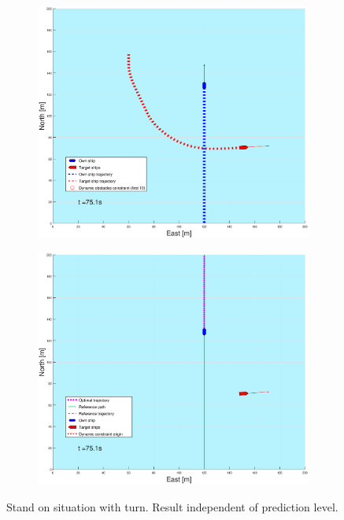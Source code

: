 \begin{figure}[ht!]
\begin{subfigure}[b]{0.499\textwidth}
    \end{subfigure}
    \hfill
    \\
    \begin{subfigure}[b]{0.49\textwidth}
        \centering
        \includegraphics[width=\textwidth]{Images/Figures/sving_SO/_Simple_0fig1_time=75}
    \end{subfigure}
    \hfill
    \begin{subfigure}[b]{0.499\textwidth}
        \centering
        \includegraphics[width=\textwidth]{Images/Figures/sving_SO/_Simple_0fig999_time=75}
    \end{subfigure}
    \hfill
    \caption{Stand on situation with turn. Result independent of prediction level.}
\end{figure}%
